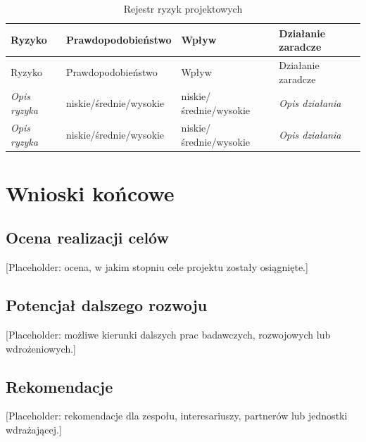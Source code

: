 \documentclass[12pt,a4paper]{report}
\begin{document}
\begin{longtable}{p{} p{} p{} p{}}
    \caption{Rejestr ryzyk projektowych} \\
    \toprule
    Ryzyko & Prawdopodobieństwo & Wpływ & Działanie zaradcze \\
    \midrule
    \endfirsthead
    \toprule
    Ryzyko & Prawdopodobieństwo & Wpływ & Działanie zaradcze \\
    \midrule
    \endhead
    \textit{Opis ryzyka} & niskie/średnie/wysokie & niskie/średnie/wysokie & \textit{Opis działania} \\
    \textit{Opis ryzyka} & niskie/średnie/wysokie & niskie/średnie/wysokie & \textit{Opis działania} \\
    \bottomrule
\end{longtable}

\chapter{Wnioski końcowe}
\section{Ocena realizacji celów}
[Placeholder: ocena, w jakim stopniu cele projektu zostały osiągnięte.]

\section{Potencjał dalszego rozwoju}
[Placeholder: możliwe kierunki dalszych prac badawczych, rozwojowych lub wdrożeniowych.]

\section{Rekomendacje}
[Placeholder: rekomendacje dla zespołu, interesariuszy, partnerów lub jednostki wdrażającej.]


\end{document}
